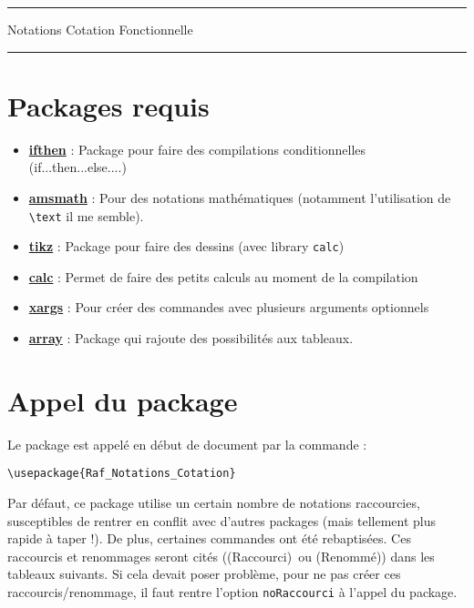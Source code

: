 \documentclass[a4paper,12pt]{article}
\newcommand{\rac}{({\color{red}Raccourci})}
\newcommand{\ren}{({\color{blue}Renommé})}
\begin{document}
	\begin{center}
		\hrule{\Large Notations Cotation Fonctionnelle}\\\hrule
	\end{center}


	\section{Packages requis}

		\begin{itemize}
			\item \href{http://www.ctan.org/pkg/ifthen}{\textbf{ifthen}} : Package pour faire des compilations conditionnelles (if...then...else....)
			\item \href{http://www.ctan.org/pkg/amsmath}{\textbf{amsmath}} : Pour des notations mathématiques (notamment l'utilisation de \verb!\text! il me semble).
			\item \href{http://www.ctan.org/pkg/pgf}{\textbf{tikz}} : Package pour faire des dessins (avec library \verb!calc!)
			\item \href{http://www.ctan.org/pkg/calc}{\textbf{calc}} : Permet de faire des petits calculs au moment de la compilation
			\item \href{http://www.ctan.org/pkg/xargs}{\textbf{xargs}} : Pour créer des commandes avec plusieurs arguments optionnels
			\item \href{http://www.ctan.org/pkg/array}{\textbf{array}} : Package qui rajoute des possibilités aux tableaux.
		\end{itemize}
		
		
	\section{Appel du package}

		Le package est appelé en début de document par la commande :
		\begin{verbatim}
\usepackage{Raf_Notations_Cotation}
		\end{verbatim}

		Par défaut, ce package utilise un certain nombre de notations raccourcies, susceptibles de rentrer en conflit avec d'autres packages (mais tellement plus rapide à taper !).
		De plus, certaines commandes ont été rebaptisées.
		Ces raccourcis et renommages seront cités (\rac\ ou \ren) dans les tableaux suivants.
		Si cela devait poser problème, pour ne pas créer ces raccourcis/renommage, il faut rentre l'option \verb!noRaccourci! à l'appel du package.
\end{document}
